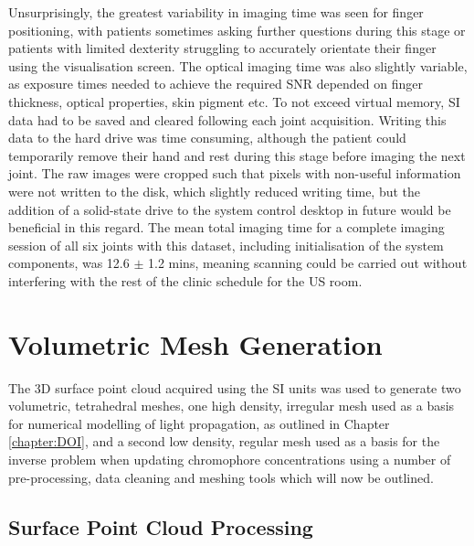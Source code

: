 \documentclass[twoside]{bhamthesis}
\theoremstyle{definition}
\begin{document}
Unsurprisingly, the greatest variability in imaging time was seen for finger positioning, with patients sometimes asking further questions during this stage or patients with limited dexterity struggling to accurately orientate their finger using the visualisation screen. The optical imaging time was also slightly variable, as exposure times needed to achieve the required SNR depended on finger thickness, optical properties, skin pigment etc. To not exceed virtual memory, SI data had to be saved and cleared following each joint acquisition. Writing this data to the hard drive was time consuming, although the patient could temporarily remove their hand and rest during this stage before imaging the next joint. The raw images were cropped such that pixels with non-useful information were not written to the disk, which slightly reduced writing time, but the addition of a solid-state drive to the system control desktop in future would be beneficial in this regard. The mean total imaging time for a complete imaging session of all six joints with this dataset, including initialisation of the system components, was 12.6 $\pm$ 1.2 mins, meaning scanning could be carried out without interfering with the rest of the clinic schedule for the US room.

\section{Volumetric Mesh Generation}

\label{Volumetric Mesh Generation}
The 3D surface point cloud acquired using the SI units was used to generate two volumetric, tetrahedral meshes, one high density, irregular mesh used as a basis for numerical modelling of light propagation, as outlined in Chapter \ref{chapter:DOI}, and a second low density, regular mesh used as a basis for the inverse problem when updating chromophore concentrations using a number of pre-processing, data cleaning and meshing tools which will now be outlined.

\subsection{Surface Point Cloud Processing}
\label{SI Processing}
\end{document}
